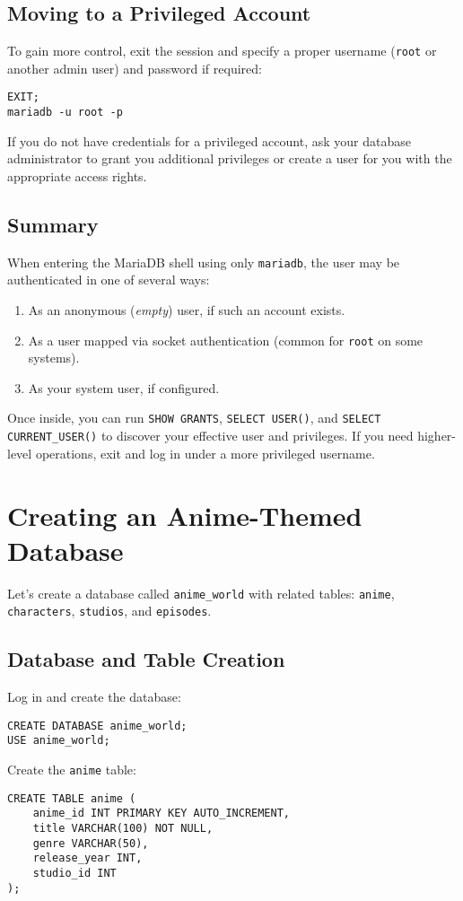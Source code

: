 \documentclass[10pt]{article}
\begin{document}
\subsection{Moving to a Privileged Account}
To gain more control, exit the session and specify a proper username (\texttt{root} or another admin user) and password if required:
\begin{verbatim}
EXIT;
mariadb -u root -p
\end{verbatim}
If you do not have credentials for a privileged account, ask your database administrator to grant you additional privileges or create a user for you with the appropriate access rights.

\subsection{Summary}
When entering the MariaDB shell using only \texttt{mariadb}, the user may be authenticated in one of several ways:
\begin{enumerate}
  \item As an anonymous (\textit{empty}) user, if such an account exists.
  \item As a user mapped via socket authentication (common for \texttt{root} on some systems).
  \item As your system user, if configured.
\end{enumerate}
Once inside, you can run \texttt{SHOW GRANTS}, \texttt{SELECT USER()}, and \texttt{SELECT CURRENT\_USER()} to discover your effective user and privileges. If you need higher-level operations, exit and log in under a more privileged username.

\section{Creating an Anime-Themed Database}
Let’s create a database called \texttt{anime\_world} with related tables: \texttt{anime}, \texttt{characters}, \texttt{studios}, and \texttt{episodes}.

\subsection{Database and Table Creation}
Log in and create the database:
\begin{verbatim}
CREATE DATABASE anime_world;
USE anime_world;
\end{verbatim}

Create the \texttt{anime} table:
\begin{verbatim}
CREATE TABLE anime (
    anime_id INT PRIMARY KEY AUTO_INCREMENT,
    title VARCHAR(100) NOT NULL,
    genre VARCHAR(50),
    release_year INT,
    studio_id INT
);
\end{verbatim}
\end{document}
